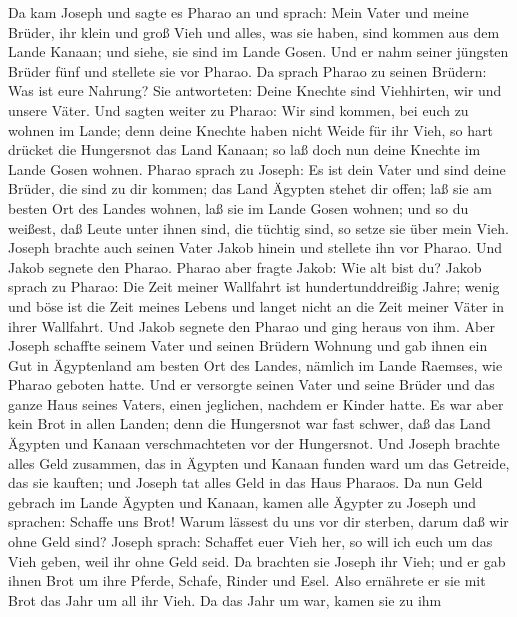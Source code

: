  Da kam Joseph und sagte es Pharao an und sprach: Mein Vater
und meine Brüder, ihr klein und groß Vieh und alles, was sie haben, sind
kommen aus dem Lande Kanaan; und siehe, sie sind im Lande Gosen.
 Und er nahm seiner jüngsten Brüder fünf und stellete sie
vor Pharao.  Da sprach Pharao zu seinen Brüdern: Was ist
eure Nahrung? Sie antworteten: Deine Knechte sind Viehhirten, wir und
unsere Väter.  Und sagten weiter zu Pharao: Wir sind kommen,
bei euch zu wohnen im Lande; denn deine Knechte haben nicht Weide für
ihr Vieh, so hart drücket die Hungersnot das Land Kanaan; so laß doch
nun deine Knechte im Lande Gosen wohnen.  Pharao sprach zu
Joseph: Es ist dein Vater und sind deine Brüder, die sind zu dir kommen;
 das Land Ägypten stehet dir offen; laß sie am besten Ort
des Landes wohnen, laß sie im Lande Gosen wohnen; und so du weißest, daß
Leute unter ihnen sind, die tüchtig sind, so setze sie über mein Vieh.
 Joseph brachte auch seinen Vater Jakob hinein und stellete
ihn vor Pharao. Und Jakob segnete den Pharao.  Pharao aber
fragte Jakob: Wie alt bist du?  Jakob sprach zu Pharao: Die
Zeit meiner Wallfahrt ist hundertunddreißig Jahre; wenig und böse ist
die Zeit meines Lebens und langet nicht an die Zeit meiner Väter in
ihrer Wallfahrt.  Und Jakob segnete den Pharao und ging
heraus von ihm.  Aber Joseph schaffte seinem Vater und
seinen Brüdern Wohnung und gab ihnen ein Gut in Ägyptenland am besten
Ort des Landes, nämlich im Lande Raemses, wie Pharao geboten hatte.
 Und er versorgte seinen Vater und seine Brüder und das
ganze Haus seines Vaters, einen jeglichen, nachdem er Kinder hatte.
 Es war aber kein Brot in allen Landen; denn die Hungersnot
war fast schwer, daß das Land Ägypten und Kanaan verschmachteten vor der
Hungersnot.  Und Joseph brachte alles Geld zusammen, das in
Ägypten und Kanaan funden ward um das Getreide, das sie kauften; und
Joseph tat alles Geld in das Haus Pharaos.  Da nun Geld
gebrach im Lande Ägypten und Kanaan, kamen alle Ägypter zu Joseph und
sprachen: Schaffe uns Brot! Warum lässest du uns vor dir sterben, darum
daß wir ohne Geld sind?  Joseph sprach: Schaffet euer Vieh
her, so will ich euch um das Vieh geben, weil ihr ohne Geld seid.
 Da brachten sie Joseph ihr Vieh; und er gab ihnen Brot um
ihre Pferde, Schafe, Rinder und Esel. Also ernährete er sie mit Brot das
Jahr um all ihr Vieh.  Da das Jahr um war, kamen sie zu ihm
